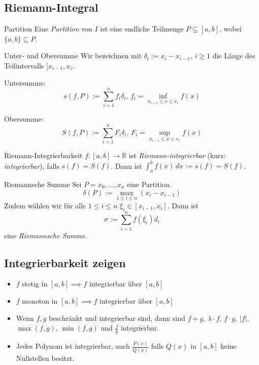\documentclass[a4paper,10pt]{article}
\def\R{\mathbb{R}}
\begin{document}
\subsection{Riemann-Integral}
\begin{subbox}{Partition}
 Eine \emph{Partition} von $I$ ist eine endliche Teilmenge $P \subsetneq [a,b]$, wobei $\{a,b\} \subseteq P$.
\end{subbox}
\begin{subbox}{Unter- und Obersumme}
Wir bezeichnen mit $\delta_i := x_i - x_{i - 1}, \, i \geq 1$ die Länge des Teilintervalls $[x_{i - 1}, x_i$.

Untersumme:
\[ s(f, P) := \sum_{i=1}^n f_i \delta_i, \, f_i = \inf_{x_{i - 1} \leq x \leq x_i} f(x) \]

Obersumme:
\[ S(f, P) := \sum_{i=1}^n F_i \delta_i, \, F_i = \sup_{x_{i - 1} \leq x \leq x_i} f(x) \]
\end{subbox}
\begin{mainbox}{Riemann-Integrierbarkeit}
 $f:[a,b] \to \R$ ist \emph{Riemann-integrierbar} (kurz: \emph{integrierbar}), falls $s(f) = S(f)$. Dann ist $\int_a^b f(x) \, dx := s(f) = S(f)$.
\end{mainbox}
\begin{subbox}{Riemannsche Summe}
Sei $P = {x_0, \dots, x_n}$ eine Partition.
\[ \delta(P) := \max_{1 \leq i \leq n} (x_i - x_{i - 1}) \]
Zudem wählen wir für alle $1 \leq i \leq n$ $\xi_i \in [x_{i - 1}, x_i]$. Dann ist
\[ \sigma := \sum_{i=1}^n f(\xi_i)d_i \]
eine \emph{Riemannsche Summe}.
\end{subbox}

\subsection{Integrierbarkeit zeigen}
\begin{itemize}
 \item $f$ stetig in $[a,b] \implies f$ integrierbar über $[a,b]$
 \item $f$ monoton in $[a,b] \implies f$ integrierbar über $[a,b]$
 \item Wenn $f,g$ beschränkt und integrierbar sind, dann sind $f+g$, $\lambda \cdot f$, $f \cdot g$, $|f|$, $\max(f,g)$, $\min(f,g)$ und $\frac{f}{g}$ integrierbar.
 \item Jedes Polynom ist integrierbar, auch $\frac{P(x)}{Q(x)}$ falls $Q(x)$ in $[a,b]$ keine Nullstellen besitzt.
\end{itemize}
\end{document}
